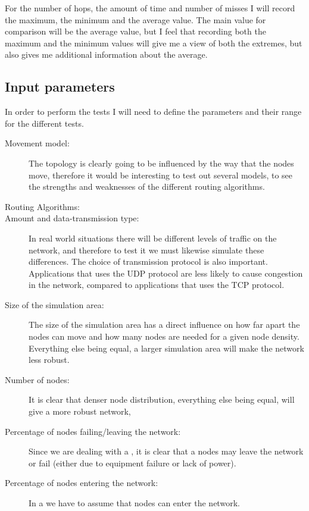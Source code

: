 For the number of hops, the amount of time and number of misses I will record the maximum, the minimum and the average value. The main value for comparison will be the average value, but I feel that recording both the maximum and the minimum values will give me a view of both the extremes, but also gives me additional information about the average.

\subsection{Input parameters}
\label{input_parameters}
In order to perform the tests I will need to define the parameters and their range for the different tests.
\begin{description}
\item[Movement model:] The topology is clearly going to be influenced by the way that the nodes move, therefore it would be interesting to test out several models, to see the strengths and weaknesses of the different routing algorithms.

\item[Routing Algorithms:] 

\item[Amount and data-transmission type:] In real world situations there will be different levels of traffic on the network, and therefore to test it we must likewise simulate these differences. The choice of transmission protocol is also important. Applications that uses the UDP protocol are less likely to cause congestion in the network, compared to applications that uses the TCP protocol.

\item[Size of the simulation area:] The size of the simulation area has a direct influence on how far apart the nodes can move and how many nodes are needed for a given node density. Everything else being equal, a larger simulation area will make the network less robust.

\item[Number of nodes:] It is clear that denser node distribution, everything else being equal, will give a more robust network,

\item[Percentage of nodes failing/leaving the network:] Since we are dealing with a \manet, it is clear that a nodes may leave the network or fail (either due to equipment failure or lack of power). 
\item[Percentage of nodes entering the network:] In a \manet we have to assume that nodes can enter the network.
\end{description}


